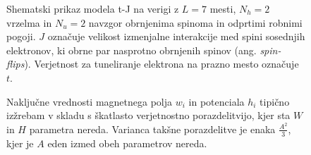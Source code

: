 \documentclass[10pt,a4paper]{article}
\begin{document}
\begin{minipage}[t]{0.6\textwidth}
\begin{figure}[H]
\caption{Shematski prikaz modela t-J na verigi z $L=7$ mesti, $N_h=2$ vrzelma in $N_u=2$ navzgor obrnjenima spinoma in odprtimi robnimi pogoji.	 $J$ označuje velikost izmenjalne interakcije med spini sosednjih elektronov, ki obrne par nasprotno obrnjenih spinov (ang. \emph{spin-flips}). Verjetnost za tuneliranje elektrona na prazno mesto označuje $t$. }
\label{fig:tJ_scheme}
\end{figure}
\begin{figure}[H]
\caption{Naključne vrednosti magnetnega polja $w_i$ in potenciala $h_i$ tipično izžrebam v skladu s škatlasto verjetnostno porazdelitvijo, kjer sta $W$ in $H$ parametra nereda. Varianca takšne porazdelitve je enaka $\frac{A^2}{3}$, kjer je $A$ eden izmed obeh parametrov nereda.  }
\label{fig:prob_dist}
\end{figure}

\end{minipage}

\end{document}
